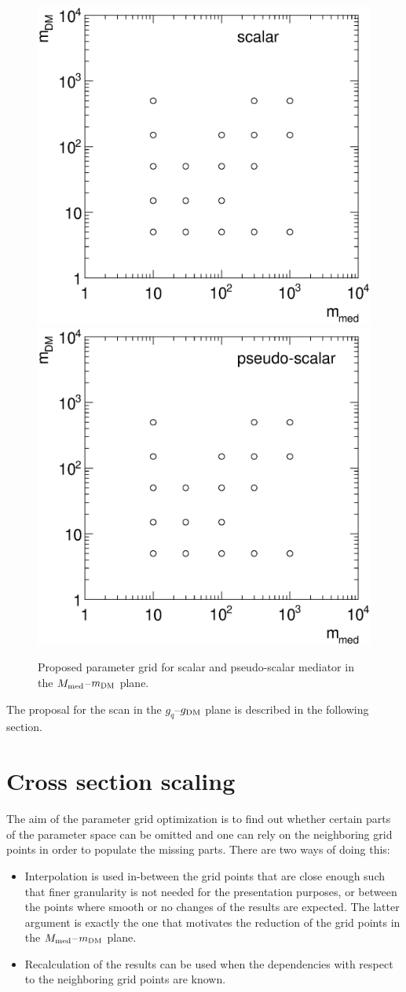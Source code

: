 \begin{figure}
\centering
\includegraphics[width=0.45\linewidth]{figures/monojet/grid_S.eps}
\includegraphics[width=0.45\linewidth]{figures/monojet/grid_P.eps}
\caption{Proposed parameter grid for scalar and pseudo-scalar mediator in the $M_{\rm{med}}$--$m_{\rm{DM}}$ plane.}
\label{fig:monojet_grid_S}
\end{figure}

The proposal for the scan in the $g_q$--$g_{\rm{DM}}$ plane is described in the following section.






\section{Cross section scaling}
\label{sec:monojet_scaling}

The aim of the parameter grid optimization is to find out whether certain parts of the parameter space can be omitted and one can rely on the neighboring grid points in order to populate the missing parts. There are two ways of doing this:
\begin{itemize}
\item Interpolation is used in-between the grid points that are close enough such that finer granularity is not needed for the presentation purposes, or between the points where smooth or no changes of the results are expected. The latter argument is exactly the one that motivates the reduction of the grid points in the $M_{\rm{med}}$--$m_{\rm{DM}}$ plane.\\
\item Recalculation of the results can be used when the dependencies with respect to the neighboring grid points are known.\\
\end{itemize}

